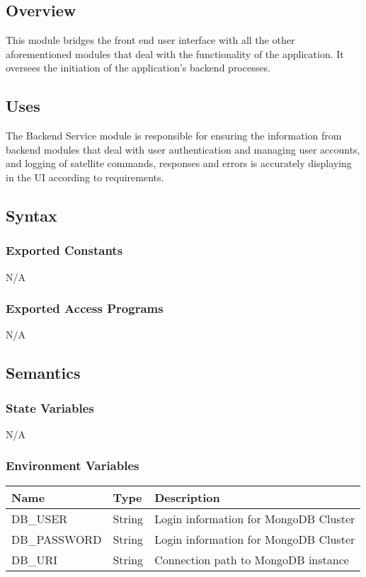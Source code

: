 \documentclass[12pt, titlepage]{article}
\begin{document}
\subsection{Overview}
This module bridges the front end user interface with all the other aforementioned modules that deal with the functionality of the application. It oversees the initiation of the application's backend processes.

\subsection{Uses}

The Backend Service module is responsible for ensuring the information from backend modules that deal with user authentication and managing user accounts, and  logging of satellite commands, responses and errors is accurately displaying in the UI according to requirements. 

\subsection{Syntax}

\subsubsection{Exported Constants}
N/A
\subsubsection{Exported Access Programs}
N/A
\subsection{Semantics}

\subsubsection{State Variables}
N/A

\subsubsection{Environment Variables}

\begin{center}
\begin{tabular}{|p{4cm} |p{4cm} |p{4cm}|}
\hline
\textbf{Name} & \textbf{Type} & \textbf{Description} \\
\hline
DB\_USER & String& Login information for MongoDB Cluster \\
\hline
DB\_PASSWORD & String & Login information for MongoDB Cluster \\
\hline
DB\_URI & String & Connection path to MongoDB instance \\
\hline
\end{tabular}
\end{center}
\end{document}
